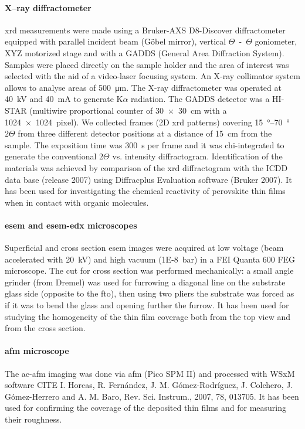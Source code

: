 	\paragraph{X--ray diffractometer} \gls{xrd} measurements were made using a Bruker-AXS D8-Discover diffractometer equipped with parallel incident beam (Göbel mirror), vertical $\Theta$~-~$\Theta$ goniometer, XYZ motorized stage and with a GADDS (General Area Diffraction System). Samples were placed directly on the sample holder and the area of interest was selected with the aid of a video-laser focusing  system. An X-ray collimator system allows to analyse areas of \SI{500}{\um}. The X-ray diffractometer was operated at \SI{40}{\kV} and \SI{40}{\mA} to generate  K$\alpha$ radiation. The GADDS detector was a HI-STAR (multiwire proportional counter of \SI{30x30}{\cm} with a \SI{1024x1024}{pixel}). We collected frames (2D \gls{xrd} patterns) covering \SIrange{15}{70}{\degree} $2\Theta$ from three different detector positions at a distance of \SI{15}{\cm} from the sample. The exposition time was \SI{300}{\s} per frame and it was chi-integrated to generate the conventional $2\Theta$ vs. intensity diffractogram. Identification of the materials was achieved by comparison of the \gls{xrd} diffractogram with the ICDD data base (release 2007) using Diffracplus Evaluation software (Bruker 2007).
	It has been used for investigating the chemical reactivity of perovskite thin films when in contact with organic molecules.
	
	\paragraph{\Acrshort{esem} and \acrshort{esem}-\acrshort{edx} microscopes} Superficial and cross section \gls{esem} images were acquired at low voltage (beam accelerated with \SI{20}{\kV}) and high vacuum (\SI{1E-8}{\bar}) in a FEI Quanta 600 FEG microscope. The cut for cross section was performed mechanically: a small angle grinder (from Dremel) was used for furrowing a diagonal line on the substrate glass side (opposite to the \gls{fto}), then using two pliers the substrate was forced as if it was to bend the glass and opening further the furrow.
	It has been used for studying the homogeneity of the thin film coverage both from the top view and from the cross section.
	
	\paragraph{\Acrshort{afm} microscope} The \acrfull{ac-afm} imaging was done via \gls{afm} (Pico SPM II) and processed with WSxM software CITE I. Horcas, R. Fernández, J. M. Gómez-Rodríguez, J. Colchero, J. Gómez-Herrero and A. M. Baro, Rev. Sci. Instrum., 2007, 78, 013705.
	It has been used for confirming the coverage of the deposited thin films and for measuring their roughness.
	
